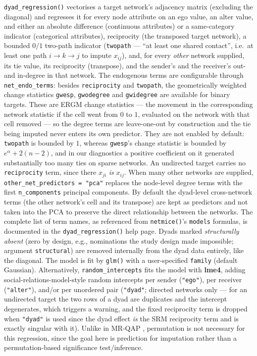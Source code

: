 \documentclass[11pt,a4paper]{article}
\newcommand{\pkg}[1]{\textbf{#1}}
\newcommand{\code}[1]{\texttt{#1}}
\begin{document}
\code{dyad\_regression()} vectorises a target network's adjacency matrix
(excluding the diagonal) and regresses it for every node attribute on an
ego value, an alter value, and either an absolute difference (continuous
attributes) or a same-category indicator (categorical attributes), reciprocity
(the transposed target network), a bounded $0/1$ two-path indicator
(\code{twopath} --- ``at least one shared contact'', i.e.\ at least one
path $i \to k \to j$ to impute $x_{ij}$), and, for every
\emph{other} network supplied, its tie value, its reciprocity (transpose), and
the sender's and the receiver's out- and in-degree in that network. The endogenous terms are configurable through
\code{net\_endo\_terms}: besides \code{reciprocity} and \code{twopath}, the
geometrically weighted change statistics \code{gwesp}, \code{gwodegree} and
\code{gwidegree} are available for binary targets. These are ERGM change
statistics --- the movement in the corresponding network statistic if the
cell went from $0$ to $1$, evaluated on the network with that cell removed
--- so the degree terms are leave-one-out by construction and the tie being
imputed never enters its own predictor. They are not enabled by default:
\code{twopath} is bounded by $1$, whereas \code{gwesp}'s change statistic is
bounded by $e^{\alpha} + 2(n-2)$, and in our diagnostics a positive
coefficient on it generated substantially too many ties on sparse networks.
An undirected target carries no \code{reciprocity} term, since there
$x_{ji}$ \emph{is} $x_{ij}$. When
many other networks are supplied, \code{other\_net\_predictors = "pca"}
replaces the node-level degree terms with the first \code{n\_components}
principal components. By default the dyad-level cross-network terms (the other
network's cell and its transpose) are kept as predictors and not taken into the
PCA to preserve the direct relationship between the networks. The complete list
of term names, as referenced from
\code{netmice()}'s \code{models} formulas, is documented in the
\code{dyad\_regression()} help page. Dyads marked \emph{structurally
absent} (zero by design, e.g., nominations the study design made
impossible; argument \code{structural}) are removed internally from the dyad data
entirely, like the diagonal. The model is fit by \code{glm()} with a user-specified
\code{family} (default Gaussian). Alternatively, \code{random\_intercepts} fits the model
with \pkg{lme4}, adding social-relations-model-style random intercepts per
sender (\code{"ego"}), per receiver (\code{"alter"}), and/or per unordered
pair (\code{"dyad"}; directed networks only --- for an undirected target
the two rows of a dyad are duplicates and the intercept degenerates, which
triggers a warning, and the fixed reciprocity term is dropped when
\code{"dyad"} is used since the dyad effect \emph{is} the SRM reciprocity
term and is exactly singular with it). Unlike in MR-QAP \citep{Krackhardt1988},
permutation is not necessary for this regression, since the goal here is
prediction for imputation
rather than a permutation-based significance test/inference.
\end{document}
